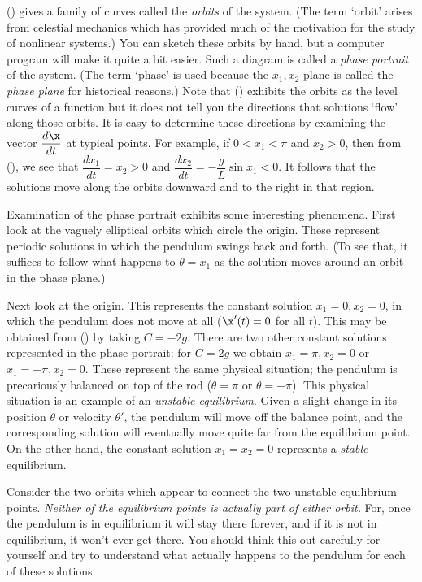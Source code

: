 (\eqn) gives a family of curves called the {\it orbits}
%
of the system.   (The term `orbit' arises from celestial mechanics
which has provided much of the motivation for the study of nonlinear
systems.)  You can sketch these orbits by hand, but a computer
program will make it quite a bit easier.
Such a diagram is called a  {\it phase portrait\/} of
the system.  (The term `phase' is used because the $x_1, x_2$-plane
is called the {\it phase plane\/} for historical reasons.)
%
%
Note that (\eqn) exhibits the orbits as the level curves of a function
but it does not tell you the directions that solutions `flow' along
those orbits.   
It is  easy to
determine these   directions by examining the vector $\dfrac{d\x}{dt}$
at typical points.   For example, if $0< x_1 < \pi$ and $x_2 > 0$,
then from (\VecEq), we see that $\dfrac{dx_1}{dt} = x_2 > 0$
and $\dfrac{dx_2}{dt} = -\dfrac gL \sin x_1 < 0$.   It follows that
the solutions move along the orbits downward and to the right in
that region.
\medskip
\centerline{}
\medskip
Examination  of the phase portrait exhibits some interesting
phenomena.  
First look at the vaguely elliptical orbits which circle the origin.
These represent periodic solutions in which the pendulum swings back
and forth.   (To see that, it suffices
to follow what happens to $\theta = x_1$ as the solution moves
around an orbit 
in the phase plane.) 
\medskip
\centerline{}
\medskip
  Next look at
the origin.   This represents the constant solution
$x_1 = 0, x_2 = 0$,  in which the pendulum does not move
at all  ($\x'(t) = 0$ for all $t$). 
This may be obtained from (\eqn) by taking
$C = -2g$.  There are two other constant solutions represented
in the phase portrait: for $C = 2g$ we obtain $x_1 = \pi, x_2 = 0$
or $x_1 = -\pi, x_2 = 0$.   These represent the same physical
situation; the pendulum is precariously balanced on top of the rod
($\theta = \pi$ or $\theta = -\pi$).   This physical situation is an
example of an {\it unstable equilibrium}.   Given a slight change in
its position $\theta$ or velocity $\theta'$, the pendulum
 will move off
the balance point, and the corresponding solution
 will eventually move quite far from the equilibrium point.
On the other hand,
the constant solution $x_1 = x_2 = 0$ represents a
{\it stable\/} equilibrium.
%
\medskip
\centerline{}
\medskip

Consider the two orbits which appear to connect the two
unstable equilibrium points.  {\it Neither of the equilibrium
points is actually part of either orbit.}   For, once the pendulum
is in equilibrium it will stay there forever, and if it is not
in equilibrium, it won't ever get there.  You should think this
out carefully for yourself and try to understand what actually
happens to the pendulum for each of these solutions.

